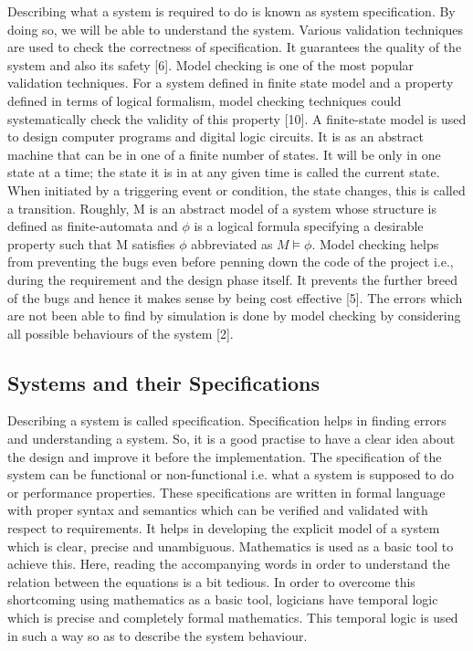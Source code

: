 \documentclass{article}
\begin{document}
Describing what a system is required to do is known as system specification. By doing so, we will be able to understand the system. Various validation techniques are used to check the correctness of specification. It guarantees the quality of the system and also its safety [6]. Model checking is one of the most popular validation techniques. For a system defined in finite state model and a property defined in terms of logical formalism, model checking techniques could systematically check the validity of this property [10]. A finite-state model is used to design computer programs and digital logic circuits. It is as an abstract machine that can be in one of a finite number of states. It will be only in one state at a time; the state it is in at any given time is called the current state. When initiated by a triggering event or condition, the state changes, this is called a transition. Roughly, M is an abstract model of a system whose structure is defined as finite-automata and $\phi$ is a logical formula specifying a desirable property such that M satisfies $\phi$ abbreviated as $M \models \phi$. Model checking helps from preventing the bugs even before penning down the code of the project i.e., during the requirement and the design phase itself. It prevents the further breed of the bugs and hence it makes sense by being cost effective [5]. The errors which are not been able to find by simulation is done by model checking by considering all possible behaviours of the system [2].  


\subsection{Systems and their Specifications}
Describing a system is called specification. Specification helps in finding errors and    understanding a system. So, it is a good practise to have a clear idea about the design and improve it before the implementation. The specification of the system can be functional or non-functional i.e. what a system is supposed to do or performance properties. These specifications are written in formal language with proper syntax and semantics which can be verified and validated with respect to requirements. 
It helps in developing the explicit model of a system which is clear, precise and unambiguous. Mathematics is used as a basic tool to achieve this. Here, reading the accompanying words in order to understand the relation between the equations is a bit tedious. In order to overcome this shortcoming using mathematics as a basic tool, logicians have temporal logic which is precise and completely formal mathematics. This temporal logic is used in such a way so as to describe the system behaviour. 
\end{document}
